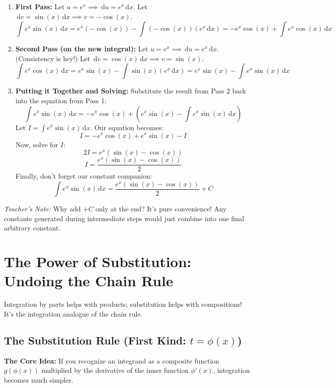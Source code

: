 \documentclass[11pt]{article}
\newcommand{\dx}{\,\mathrm{d}x} %
\newcommand{\du}{\,\mathrm{d}u} %
\newcommand{\dv}{\,\mathrm{d}v} %
\begin{document}
\begin{enumerate}
    \item \textbf{First Pass:}
        Let $u = e^x \implies \du = e^x \dx$.
        Let $\dv = \sin(x) \dx \implies v = -\cos(x)$.
        \[ \int e^x \sin(x) \dx = e^x(-\cos(x)) - \int (-\cos(x))(e^x \dx) = -e^x \cos(x) + \int e^x \cos(x) \dx \]

    \item \textbf{Second Pass (on the new integral):}
        Let $u = e^x \implies \du = e^x \dx$. (Consistency is key!)
        Let $\dv = \cos(x) \dx \implies v = \sin(x)$.
        \[ \int e^x \cos(x) \dx = e^x \sin(x) - \int \sin(x)(e^x \dx) = e^x \sin(x) - \int e^x \sin(x) \dx \]

    \item \textbf{Putting it Together and Solving:}
        Substitute the result from Pass 2 back into the equation from Pass 1:
        \[ \int e^x \sin(x) \dx = -e^x \cos(x) + \left( e^x \sin(x) - \int e^x \sin(x) \dx \right) \]
        Let $I = \int e^x \sin(x) \dx$. Our equation becomes:
        \[ I = -e^x \cos(x) + e^x \sin(x) - I \]
        Now, solve for $I$:
        \[ 2I = e^x (\sin(x) - \cos(x)) \]
        \[ I = \frac{e^x (\sin(x) - \cos(x))}{2} \]
        Finally, don't forget our constant companion:
        \[ \boxed{\int e^x \sin(x) \dx = \frac{e^x (\sin(x) - \cos(x))}{2} + C} \]
\end{enumerate}
\textit{Teacher's Note:} Why add $+C$ only at the end? It's pure convenience! Any constants generated during intermediate steps would just combine into one final arbitrary constant.

\section{The Power of Substitution: Undoing the Chain Rule}

Integration by parts helps with products; substitution helps with compositions! It's the integration analogue of the chain rule.

\subsection{The Substitution Rule (First Kind: $t = \phi(x)$)}

\textbf{The Core Idea:} If you recognize an integrand as a composite function $g(\phi(x))$ multiplied by the derivative of the inner function $\phi'(x)$, integration becomes much simpler.
\end{document}
